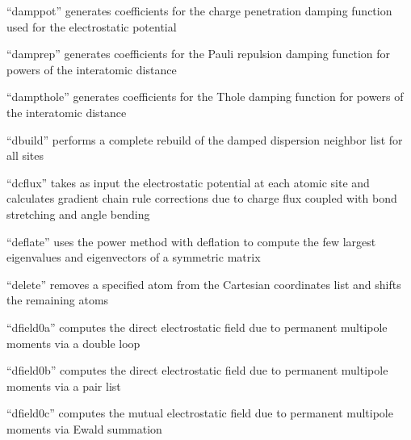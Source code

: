 \documentclass[letterpaper,11pt,english]{sphinxmanual}
\begin{document}
“damppot” generates coefficients for the charge penetration
damping function used for the electrostatic potential


“damprep” generates coefficients for the Pauli repulsion
damping function for powers of the interatomic distance


“dampthole” generates coefficients for the Thole damping
function for powers of the interatomic distance


“dbuild” performs a complete rebuild of the damped dispersion
neighbor list for all sites


“dcflux” takes as input the electrostatic potential at each
atomic site and calculates gradient chain rule corrections due
to charge flux coupled with bond stretching and angle bending


“deflate” uses the power method with deflation to compute the
few largest eigenvalues and eigenvectors of a symmetric matrix


“delete” removes a specified atom from the Cartesian
coordinates list and shifts the remaining atoms





“dfield0a” computes the direct electrostatic field due to
permanent multipole moments via a double loop


“dfield0b” computes the direct electrostatic field due to
permanent multipole moments via a pair list


“dfield0c” computes the mutual electrostatic field due to
permanent multipole moments via Ewald summation

\end{document}
